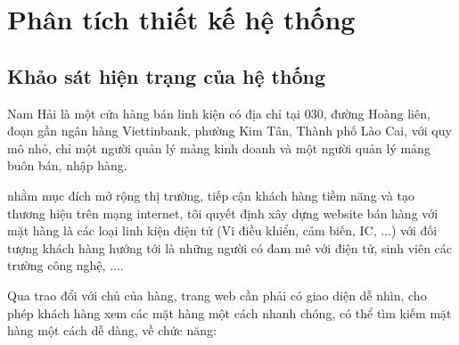 \chapter{Phân tích thiết kế hệ thống}
\section{Khảo sát hiện trạng của hệ thống}
Nam Hải là một cửa hàng bán linh kiện có địa chỉ tại 030, đường Hoàng liên, đoạn gần ngân hàng Viettinbank, phường Kim Tân, Thành phố Lào Cai, với quy mô nhỏ, chỉ một người quản lý mảng kinh doanh và một người quản lý mảng buôn bán, nhập hàng.\par
nhằm mục đích mở rộng thị trường, tiếp cận khách hàng tiềm năng và tạo thương hiệu trên mạng internet, tôi quyết định xây dựng website bán hàng với mặt hàng là các loại linh kiện điện tử (Vi điều khiển, cảm biến, IC, ...) với đối tượng khách hàng hướng tới là những người có đam mê với điện tử, sinh viên các trường công nghệ, ....\par
Qua trao đổi với chủ của hàng, trang web cần phải có giao diện dễ nhìn, cho phép khách hàng xem các mặt hàng một cách nhanh chóng, có thể tìm kiếm mặt hàng một cách dễ dàng, về chức năng:
